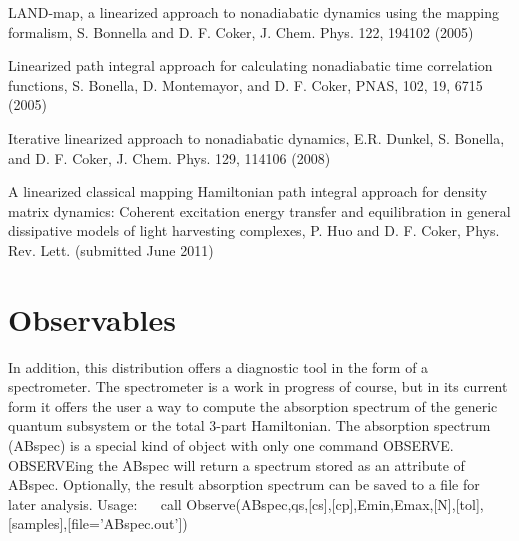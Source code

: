 \begin{DoxyEnumerate}
\item L\+A\+N\+D-\/map, a linearized approach to nonadiabatic dynamics using the mapping formalism, S. Bonnella and D. F. Coker, J. Chem. Phys. 122, 194102 (2005)~\newline

\item Linearized path integral approach for calculating nonadiabatic time correlation functions, S. Bonella, D. Montemayor, and D. F. Coker, P\+N\+A\+S, 102, 19, 6715 (2005)~\newline

\item Iterative linearized approach to nonadiabatic dynamics, E.\+R. Dunkel, S. Bonella, and D. F. Coker, J. Chem. Phys. 129, 114106 (2008)~\newline

\item A linearized classical mapping Hamiltonian path integral approach for density matrix dynamics\+: Coherent excitation energy transfer and equilibration in general dissipative models of light harvesting complexes, P. Huo and D. F. Coker, Phys. Rev. Lett. (submitted June 2011)~\newline
~\newline

\end{DoxyEnumerate}\hypertarget{_interface_Observables}{}\section{Observables}\label{_interface_Observables}
In addition, this distribution offers a diagnostic tool in the form of a spectrometer. The spectrometer is a work in progress of course, but in its current form it offers the user a way to compute the absorption spectrum of the generic quantum subsystem or the total 3-\/part Hamiltonian. The absorption spectrum (A\+Bspec) is a special kind of object with only one command O\+B\+S\+E\+R\+V\+E. O\+B\+S\+E\+R\+V\+Eing the A\+Bspec will return a spectrum stored as an attribute of A\+Bspec. Optionally, the result absorption spectrum can be saved to a file for later analysis. Usage\+:~\newline
~\newline
 call Observe(A\+Bspec,qs,\mbox{[}cs\mbox{]},\mbox{[}cp\mbox{]},Emin,Emax,\mbox{[}N\mbox{]},\mbox{[}tol\mbox{]},\mbox{[}samples\mbox{]},\mbox{[}file='A\+Bspec.\+out'\mbox{]})~\newline
